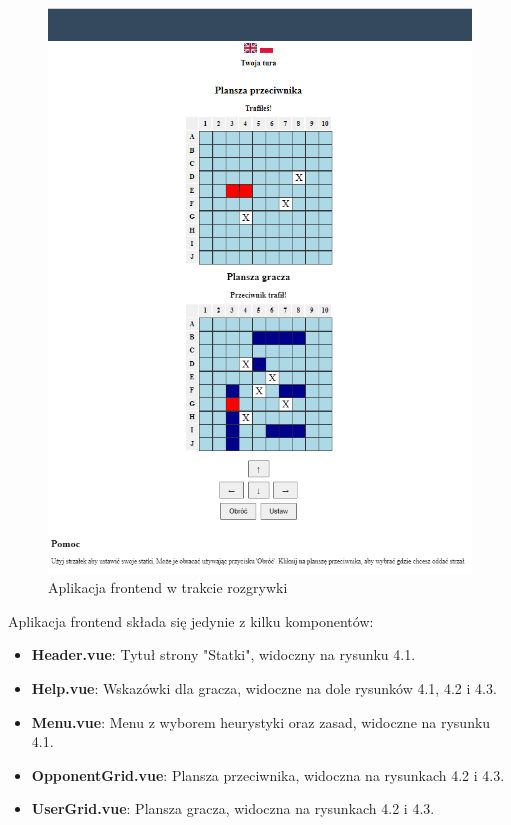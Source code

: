 \begin{figure}[!h]
    \label{fig:frontend--in-game}
    \centering \includegraphics[width=1\linewidth]{img/frontend-in-game.PNG}
    \caption{Aplikacja frontend w trakcie rozgrywki}
\end{figure}

Aplikacja frontend składa się jedynie z kilku komponentów:
\begin{itemize}
    \item \textbf{Header.vue}: Tytuł strony "Statki", widoczny na rysunku 4.1.
    \item \textbf{Help.vue}: Wskazówki dla gracza, widoczne na dole rysunków 4.1, 4.2 i 4.3.
    \item \textbf{Menu.vue}: Menu z wyborem heurystyki oraz zasad, widoczne na rysunku 4.1.
    \item \textbf{OpponentGrid.vue}: Plansza przeciwnika, widoczna na rysunkach 4.2 i 4.3.
    \item \textbf{UserGrid.vue}: Plansza gracza, widoczna na rysunkach 4.2 i 4.3.
\end{itemize}

